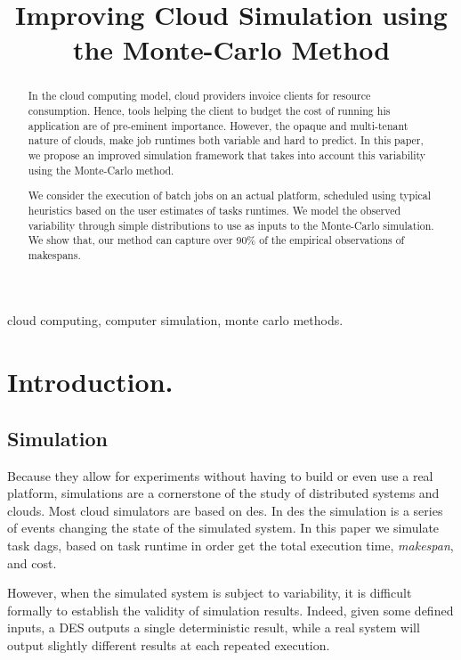 \documentclass[10pt,conference,compsocconf]{IEEEtran}
\title{Improving Cloud Simulation using the Monte-Carlo Method}
\author{\IEEEauthorblockN{Luke~Bertot 
			and Stéphane~Genaud 
			and Julien~Gossa}
	\IEEEauthorblockA{Icube-ICPS --- UMR 7357, Univeristé de Strasbourg, CNRS\\
		P\^ole API Blvd S. Bant, 67400 Illkirch-Graffenstaden\\
		email: \url{lbertot@unistra.fr}, \url{genaud@unistra.fr}, \url{gossa@unistra.fr}}
	}
\begin{document}
\maketitle

\begin{abstract}
  In the  cloud computing  model, cloud providers  invoice clients  for resource
  consumption. Hence, tools helping the client to budget the cost of running his
  application are  of pre-eminent  importance. However, the opaque and 
  multi-tenant nature of clouds, make job runtimes both variable and hard to 
  predict.  In this  paper, we  propose an improved simulation framework that 
  takes into account  this variability using the Monte-Carlo method.

  We consider  the execution of batch jobs on  an actual platform, scheduled
  using typical  heuristics based  on the  user estimates  of tasks runtimes. We
  model  the observed  variability through  simple  distributions to use  as
  inputs  to the  Monte-Carlo  simulation. We show that, our method can capture 
  over  90\% of the empirical observations of makespans.
\end{abstract}

\begin{IEEEkeywords}
cloud computing, computer simulation, monte carlo methods.
\end{IEEEkeywords}


\section{Introduction.}

\subsection{Simulation}

Because they allow for experiments without having to build or even use a real 
platform, simulations are a cornerstone of the study of distributed
systems and clouds.  
Most cloud simulators  are based on \ac{des}. In \ac{des}  the simulation is a
series  of events  changing the  state of  the simulated  system. In this paper
we simulate task \acp{dag}, based on task runtime in order get the total
execution time, \emph{makespan}, and cost.

However, when the simulated system is subject to variability, it is difficult
formally to establish  the  validity of  simulation  results. Indeed, given some
defined inputs, a DES outputs a single deterministic result, while a real system
will output  slightly different results  at each repeated execution.
\end{document}
